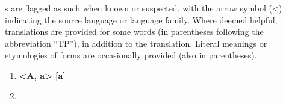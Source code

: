   s are flagged as such when known or suspected, with the arrow symbol (<) indicating the source language or language family. Where deemed helpful,  translations are provided for some words (in parentheses following the abbreviation “TP”), in addition to the  translation. Literal meanings or \mbox{etymologies} of  forms are occasionally provided (also in parentheses).\\


\begin{enumerate}[noitemsep, label={}, align=left, widest=190, labelsep=1ex,leftmargin=*,itemindent=-10pt]

\item
\noindent \textbf{<A, a>        [a]}\\ \item


\end{enumerate}
